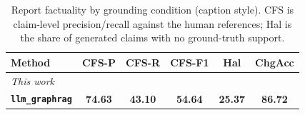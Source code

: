\begin{table}[t]
\centering
\caption{Report factuality by grounding condition (caption style). CFS is claim-level precision/recall against the human references; Hal is the share of generated claims with no ground-truth support.}
\label{tab:factuality_caption}
\setlength{\tabcolsep}{3pt}
\begin{tabular}{lccccc}
\toprule
Method & CFS-P & CFS-R & CFS-F1 & Hal & ChgAcc \\
\midrule
\multicolumn{6}{l}{\emph{This work}} \\
\textbf{\texttt{llm\_graphrag}} & \textbf{74.63} & \textbf{43.10} & \textbf{54.64} & \textbf{25.37} & \textbf{86.72} \\
\bottomrule
\end{tabular}
\end{table}
